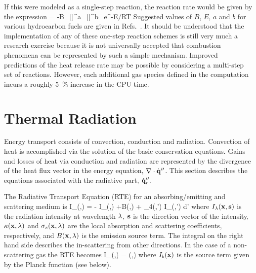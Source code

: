 \documentclass[11pt]{book}
\begin{document}
\be  {}   \ee
If this were modeled as a single-step reaction, the reaction rate would be given by the expression
\be {} = -B \, []^a \, []^b \, e^{-E/RT}
   \label{reaction} \ee
Suggested values of $B$, $E$, $a$ and $b$ for various hydrocarbon
fuels are given
in Refs.~\cite{Puri:1,Westbrook:1}. It should be understood that the
implementation of any of these one-step reaction schemes is still very
much a research exercise because it is not universally accepted that
combustion phenomena can be represented by such a simple mechanism.
Improved predictions of the heat release rate may be possible by considering a multi-step set of reactions.
However, each additional gas species defined in the computation incurs a roughly 5~\% increase in the CPU time.





\clearpage
\section{Thermal Radiation}

Energy transport consists of convection, conduction and
radiation. Convection of heat is accomplished via the solution of the
basic conservation equations. Gains and losses of heat via conduction
and radiation are represented by the divergence of the heat flux
vector in the energy equation, $\nabla \cdot \dot{\bf q}''$. This section
describes the equations associated with the radiative part, $\dot{\bf q}''_r$.


The Radiative Transport Equation (RTE) for an absorbing/emitting
and scattering medium is
\be \bs \cdot \nabla I_{\la}(\bx,\bs) =
 - \;
I_\la(\bx,\bs) +B(\bx,\la) + 
\int_{4\pi}\Phi(\bs,\bs') \; I_{\la}(\bx,\bs') \; d\bs'
\label{RTEbasic} \ee
where $I_{\lambda}({\bf x},{\bf s})$ is the radiation intensity at wavelength
$\lambda$, ${\bf s}$ is the direction vector of the intensity,
$\kappa({\bf x},\lambda)$ and $\sigma_s({\bf x},\lambda)$ are the local absorption
and scattering coefficients,
respectively, and $B({\bf x},\lambda)$ is the emission source term.
The integral on the
right hand side describes the in-scattering from other directions.
In the case of a non-scattering gas the RTE becomes
\be \bs \cdot \nabla I_{\la}(\bx,\bs) = \kappa(\bx,\la) \; \Big[ I_b(\bx)
- I_\la(\bx,\bs) \Big] \label{RTE} \ee
where $I_b({\bf x})$ is the source term given by the Planck function (see below).
\end{document}
